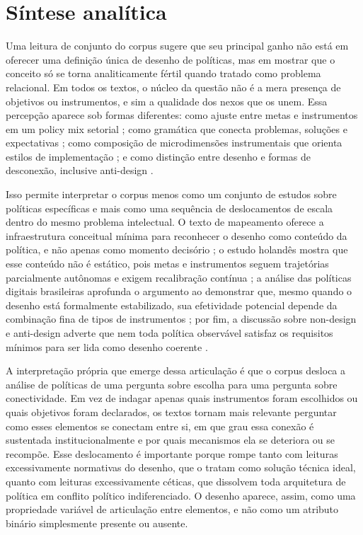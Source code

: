 \documentclass[12pt,a4paper]{article}
\begin{document}
\section{Síntese analítica}
\label{sec:orge6924b8}

Uma leitura de conjunto do corpus sugere que seu principal ganho não está em oferecer uma definição única de desenho de políticas, mas em mostrar que o conceito só se torna analiticamente fértil quando tratado como problema relacional. Em todos os textos, o núcleo da questão não é a mera presença de objetivos ou instrumentos, e sim a qualidade dos nexos que os unem. Essa percepção aparece sob formas diferentes: como ajuste entre metas e instrumentos em um policy mix setorial \parencite{geet2019_policy_design}; como gramática que conecta problemas, soluções e expectativas \parencite{lima2021_conectando_problemas}; como composição de microdimensões instrumentais que orienta estilos de implementação \parencite{lui2026_micro_dimensions}; e como distinção entre desenho e formas de desconexão, inclusive anti-design \parencite{newman2020_policy_design}.

Isso permite interpretar o corpus menos como um conjunto de estudos sobre políticas específicas e mais como uma sequência de deslocamentos de escala dentro do mesmo problema intelectual. O texto de mapeamento oferece a infraestrutura conceitual mínima para reconhecer o desenho como conteúdo da política, e não apenas como momento decisório \parencite{lima2021_conectando_problemas}; o estudo holandês mostra que esse conteúdo não é estático, pois metas e instrumentos seguem trajetórias parcialmente autônomas e exigem recalibração contínua \parencite{geet2019_policy_design}; a análise das políticas digitais brasileiras aprofunda o argumento ao demonstrar que, mesmo quando o desenho está formalmente estabilizado, sua efetividade potencial depende da combinação fina de tipos de instrumentos \parencite{lui2026_micro_dimensions}; por fim, a discussão sobre non-design e anti-design adverte que nem toda política observável satisfaz os requisitos mínimos para ser lida como desenho coerente \parencite{newman2020_policy_design}.

A interpretação própria que emerge dessa articulação é que o corpus desloca a análise de políticas de uma pergunta sobre escolha para uma pergunta sobre conectividade. Em vez de indagar apenas quais instrumentos foram escolhidos ou quais objetivos foram declarados, os textos tornam mais relevante perguntar como esses elementos se conectam entre si, em que grau essa conexão é sustentada institucionalmente e por quais mecanismos ela se deteriora ou se recompõe. Esse deslocamento é importante porque rompe tanto com leituras excessivamente normativas do desenho, que o tratam como solução técnica ideal, quanto com leituras excessivamente céticas, que dissolvem toda arquitetura de política em conflito político indiferenciado. O desenho aparece, assim, como uma propriedade variável de articulação entre elementos, e não como um atributo binário simplesmente presente ou ausente.
\end{document}
